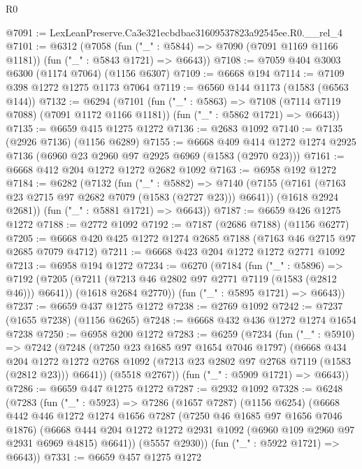\begin{lexlean}{R0}
\begin{coremodule}
@7091 := LexLeanPreserve.Ca3e321ecbdbae31609537823a92545ee.R0.__rel_4
@7101 := @6312
    (@7058
      (fun ("_" : @5844) => @7090 (@7091 @1169 @1166 @1181))
      (fun ("_" : @5843 @1721) => @6643))
@7108 := @7059 @404 @3003 @6300 (@1174 @7064) (@1156 @6307)
@7109 := @6668 @194
@7114 := @7109 @398 @1272 @1275 @1173 @7064
@7119 := @6560 @144 @1173 (@1583 (@6563 @144))
@7132 := @6294
    (@7101
      (fun ("_" : @5863) => @7108 (@7114 @7119 @7088) (@7091 @1172 @1166 @1181))
      (fun ("_" : @5862 @1721) => @6643))
@7135 := @6659 @415 @1275 @1272
@7136 := @2683 @1092
@7140 := @7135 (@2926 @7136) (@1156 @6289)
@7155 := @6668
    @409
    @414
    @1272
    @1274
    @2925
    @7136
    (@6960 @23 @2960 @97 @2925 @6969 (@1583 (@2970 @23)))
@7161 := @6668 @412 @204 @1272 @1272 @2682 @1092
@7163 := @6958 @192 @1272
@7184 := @6282
    (@7132
      (fun ("_" : @5882) =>
      @7140
        (@7155 (@7161 (@7163 @23 @2715 @97 @2682 @7079 (@1583 (@2727 @23))) @6641))
        (@1618 @2924 @2681))
      (fun ("_" : @5881 @1721) => @6643))
@7187 := @6659 @426 @1275 @1272
@7188 := @2772 @1092
@7192 := @7187 (@2686 @7188) (@1156 @6277)
@7205 := @6668 @420 @425 @1272 @1274 @2685 @7188 (@7163 @46 @2715 @97 @2685 @7079 @4712)
@7211 := @6668 @423 @204 @1272 @1272 @2771 @1092
@7213 := @6958 @194 @1272
@7234 := @6270
    (@7184
      (fun ("_" : @5896) =>
      @7192
        (@7205 (@7211 (@7213 @46 @2802 @97 @2771 @7119 (@1583 (@2812 @46))) @6641))
        (@1618 @2684 @2770))
      (fun ("_" : @5895 @1721) => @6643))
@7237 := @6659 @437 @1275 @1272
@7238 := @2769 @1092
@7242 := @7237 (@1655 @7238) (@1156 @6265)
@7248 := @6668 @432 @436 @1272 @1274 @1654 @7238
@7250 := @6958 @200 @1272
@7283 := @6259
    (@7234
      (fun ("_" : @5910) =>
      @7242
        (@7248
          (@7250 @23 @1685 @97 @1654 @7046 @1797)
          (@6668
            @434
            @204
            @1272
            @1272
            @2768
            @1092
            (@7213 @23 @2802 @97 @2768 @7119 (@1583 (@2812 @23)))
            @6641))
        (@5518 @2767))
      (fun ("_" : @5909 @1721) => @6643))
@7286 := @6659 @447 @1275 @1272
@7287 := @2932 @1092
@7328 := @6248
    (@7283
      (fun ("_" : @5923) =>
      @7286
        (@1657 @7287)
        (@1156 @6254)
        (@6668
          @442
          @446
          @1272
          @1274
          @1656
          @7287
          (@7250 @46 @1685 @97 @1656 @7046 @1876)
          (@6668 @444 @204 @1272 @1272 @2931 @1092 (@6960 @109 @2960 @97 @2931 @6969 @4815) @6641))
        (@5557 @2930))
      (fun ("_" : @5922 @1721) => @6643))
@7331 := @6659 @457 @1275 @1272

\end{coremodule}
\end{lexlean}
